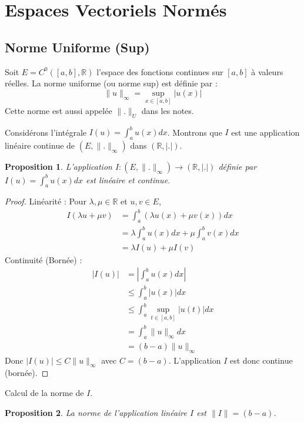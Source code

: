 \documentclass{article}
\newtheorem{proposition}{Proposition} %
\theoremstyle{definition} %
\begin{document}
\sloppy

\section{Espaces Vectoriels Normés}

\subsection{Norme Uniforme (Sup)}
Soit $E = C^0([a,b], \mathbb{R})$ l'espace des fonctions continues sur $[a,b]$ à valeurs réelles.
La norme uniforme (ou norme sup) est définie par :
\[ \|u\|_\infty = \sup_{x \in [a,b]} |u(x)| \]
Cette norme est aussi appelée $\|.\|_U$ dans les notes.

Considérons l'intégrale $I(u) = \int_a^b u(x) dx$. Montrons que $I$ est une application linéaire continue de $(E, \|.\|_\infty)$ dans $(\mathbb{R}, |.|)$.

\begin{proposition}
L'application $I: (E, \|.\|_\infty) \to (\mathbb{R}, |. |)$ définie par $I(u) = \int_a^b u(x) dx$ est linéaire et continue.
\end{proposition}

\begin{proof}
Linéarité : Pour $\lambda, \mu \in \mathbb{R}$ et $u, v \in E$,
\begin{align*} I(\lambda u + \mu v) &= \int_a^b (\lambda u(x) + \mu v(x)) dx \\ &= \lambda \int_a^b u(x) dx + \mu \int_a^b v(x) dx \\ &= \lambda I(u) + \mu I(v) \end{align*}
Continuité (Bornée) :
\begin{align*} |I(u)| &= \left| \int_a^b u(x) dx \right| \\ &\le \int_a^b |u(x)| dx \\ &\le \int_a^b \sup_{t \in [a,b]} |u(t)| dx \\ &= \int_a^b \|u\|_\infty dx \\ &= (b-a) \|u\|_\infty \end{align*}
Donc $|I(u)| \le C \|u\|_\infty$ avec $C = (b-a)$. L'application $I$ est donc continue (bornée).
\end{proof}

Calcul de la norme de $I$.

\begin{proposition}
La norme de l'application linéaire $I$ est $\|I\| = (b-a)$.
\end{proposition}
\end{document}
